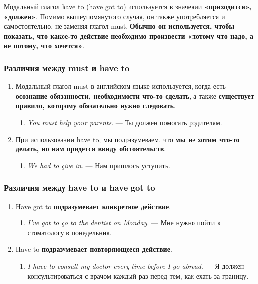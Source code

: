 \documentclass{article}
\begin{document}
Модальный глагол have to (have got to) используется в значении \textbf{«приходится», «должен»}. Помимо вышеупомянутого случая, он также употребляется и самостоятельно, не заменяя глагол must. \textbf{Обычно он используется, чтобы показать, что какое-то действие необходимо произвести «потому что надо, а не потому, что хочется»}.

\subsubsection{Различия между must и have to}

\begin{enumerate}
	\item Модальный глагол must в английском языке используется, когда есть \textbf{осознание обязанности, необходимости что-то сделать}, а также \textbf{существует правило, которому обязательно нужно следовать}.
	\begin{enumerate}
		\item \emph{You must help your parents}. — Ты должен помогать родителям. 
	\end{enumerate}
	\item При использовании have to, мы подразумеваем, что \textbf{мы не хотим что-то делать, но нам придется ввиду обстоятельств}.
	\begin{enumerate}
	 	\item \emph{We had to give in}. — Нам пришлось уступить. 
	 \end{enumerate} 
\end{enumerate}

\subsubsection{Различия между have to и have got to}

\begin{enumerate}
	\item Have got to \textbf{подразумевает конкретное действие}.
	\begin{enumerate}
		\item \emph{I’ve got to go to the dentist on Monday}. — Мне нужно пойти к стоматологу в понедельник. 
	\end{enumerate}
	\item Have to \textbf{подразумевает повторяющееся действие}.
	\begin{enumerate}
		\item \emph{I have to consult my doctor every time before I go abroad}. — Я должен консультироваться с врачом каждый раз перед тем, как ехать за границу. 
	\end{enumerate}
\end{enumerate}
\end{document}
